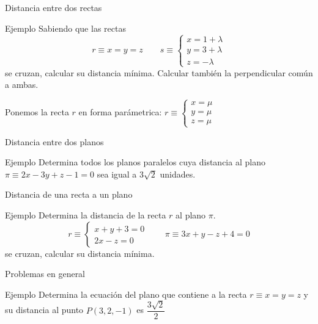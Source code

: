 \documentclass[8pt,handout]{beamer}
\begin{document}
\begin{frame}{Distancia entre dos rectas}
\begin{exampleblock}{Ejemplo}
Sabiendo que las rectas 
\[ r \equiv x=y=z \qquad s \equiv \begin{cases} x= 1 + \lambda \\ y = 3+\lambda \\ z= -\lambda \end{cases}\]
se cruzan, calcular su distancia mínima. Calcular también la perpendicular común a ambas.
\end{exampleblock}
\pause
Ponemos la recta $r$ en forma parámetrica: \pause $r \equiv \begin{cases} x=  \mu \\ y = \mu \\ z= \mu \end{cases}$
\end{frame}

\begin{frame}{Distancia entre dos planos}
\begin{exampleblock}{Ejemplo}
Determina todos los planos paralelos cuya distancia al plano $\pi \equiv 2x-3y+z-1=0$ sea igual a $3\sqrt{2}$ unidades.
\end{exampleblock}
\end{frame}

\begin{frame}{Distancia de  una recta a un plano}
\begin{exampleblock}{Ejemplo}
Determina la distancia de la recta $r$ al plano $\pi$.
\[ r \equiv \begin{cases} x+y+3=0 \\ 2x-z= 0 \end{cases} \qquad \pi \equiv 3x+y-z+4=0 \]
se cruzan, calcular su distancia mínima.
\end{exampleblock}
\end{frame}

\begin{frame}{Problemas en general}
\begin{exampleblock}{Ejemplo}
Determina la ecuación del plano que contiene a la recta $r \equiv x=y=z$ y su distancia al punto $P(3,2,-1)$ es $\dfrac{3\sqrt{2}}{2}$
\end{exampleblock}

\end{frame}
\end{document}
